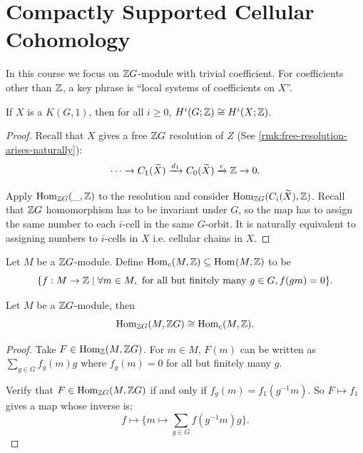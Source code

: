 \section{Compactly Supported Cellular Cohomology}
\label{sec:L03-W01D3}

In this course we focus on \(\Z G\)-module with trivial coefficient. For coefficients other than \(\Z\), a key phrase is ``local systems of coefficients on \(X\)''.


\begin{theorem}
    \label{thm:group-cohomology-cong-cellular-cohomology}
    If \(X\) is a \(K(G,1)\), then for all \(i\geq 0\), \(H^i(G;\Z) \cong H^i(X;\Z)\).
\end{theorem}
\begin{proof}
    Recall that \(X\) gives a free \(\Z G\) resolution of \(Z\) (See \cref{rmk:free-resolution-arises-naturally}):
    \[
        \cdots \to C_1(\tilde X) \xrightarrow{d_1} C_0(\tilde X) \xrightarrow{\epsilon} \Z \to 0.
    \]

    Apply \(\Hom{\_}{\Z }{\Z G}\) to the resolution and consider \(\Hom{C_i(\tilde X  )}{\Z }{\Z G}\). Recall that \(\Z G\) homomorphism has to be invariant under \(G\), so the map has to assign the same number to each \(i\)-cell in the same \(G\)-orbit. It is naturally equivalent to assigning numbers to \(i\)-cells in \(X\) i.e. cellular chains in \(X\).
\end{proof}

\begin{definition}
    \label{def:compact-homomorphism}
    Let \(M\) be a \(\Z G\)-module.     Define \(\Hom{M}{\Z }{c} \subseteq \Hom{M }{\Z }{} \) to be 
    \[
        \{ f:M\to \Z \mid \forall m \in M, \text{ for all but finitely many } g\in G, f(gm)=0 \}.
    \] 
\end{definition}

\begin{lemma}
    \label{lem:compact-homomorphism-cong-ZG-homomorphism}
    Let \(M\) be a \(\Z G\)-module, then 
    \[
        \Hom{M }{\Z G }{\Z G} \cong \Hom{M }{\Z }{c}.
    \]
\end{lemma}
\begin{proof}
    Take \(F \in \Hom{M }{\Z G }{\Z}\). For \(m\in M\), \(F(m)\) can be written as \(\sum_{g\in G} f_g(m) g\) where \(f_g(m)=0\) for all but finitely many \(g\).

    Verify that   \(F \in \Hom{M }{\Z G }{\Z G}\) if and only if \(f_g(m) = f_1(g^{-1}m)\). So \(F\mapsto f_1\) gives a map whose inverse is:
    \[ f\mapsto \{ m\mapsto \sum_{g\in G} f(g^{-1}m) g\}. \]
\end{proof}


